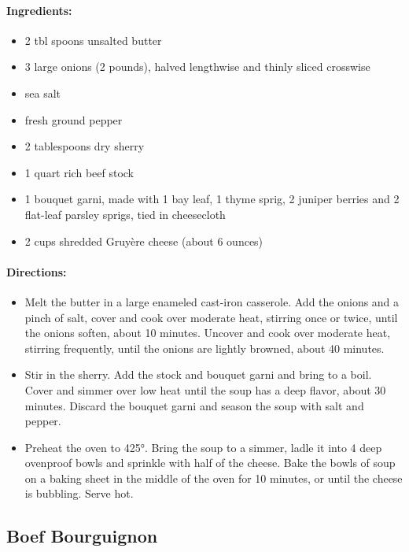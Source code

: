 \documentclass{article}
\begin{document}
\paragraph{Ingredients:}

\begin{itemize}
	\item 2 tbl spoons unsalted butter
	\item 3 large onions (2 pounds), halved lengthwise and thinly sliced crosswise
	\item sea salt
	\item fresh ground pepper
	\item 2 tablespoons dry sherry
	\item 1 quart rich beef stock
	\item 1 bouquet garni, made with 1 bay leaf, 1 thyme sprig, 2 juniper berries and 2 flat-leaf parsley sprigs, tied in cheesecloth
	\item 2 cups shredded Gruyère cheese (about 6 ounces)
\end{itemize}

\paragraph{Directions:}
\begin{itemize}
	\item Melt the butter in a large enameled cast-iron casserole. Add the onions and a pinch of salt, cover and cook over moderate heat, stirring once or twice, until the onions soften, about 10 minutes. Uncover and cook over moderate heat, stirring frequently, until the onions are lightly browned, about 40 minutes.
	\item Stir in the sherry. Add the stock and bouquet garni and bring to a boil. Cover and simmer over low heat until the soup has a deep flavor, about 30 minutes. Discard the bouquet garni and season the soup with salt and pepper.
	\item Preheat the oven to 425°. Bring the soup to a simmer, ladle it into 4 deep ovenproof bowls and sprinkle with half of the cheese. Bake the bowls of soup on a baking sheet in the middle of the oven for 10 minutes, or until the cheese is bubbling. Serve hot.
\end{itemize}

\subsection{Boef Bourguignon}
\end{document}
